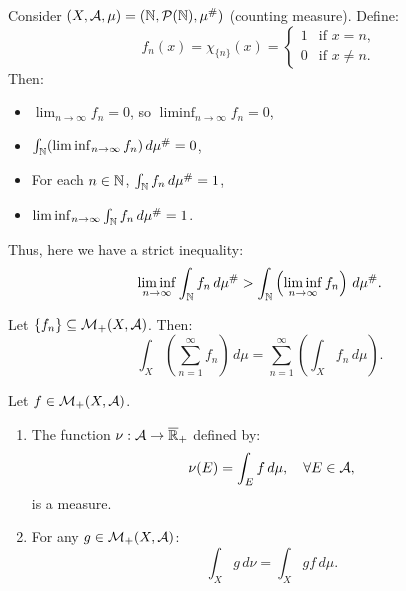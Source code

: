 \begin{remark}
Consider $(X, \mathcal{A}, \mu) = (\mathbb{N}, \mathcal{P}(\mathbb{N}), \mu^{\#})$ (counting measure). Define:
\[
f_n(x) = \chi_{\{n\}}(x) = 
\begin{cases}
1 & \text{if } x = n, \\
0 & \text{if } x \neq n.
\end{cases}
\]
Then:
\begin{itemize}
    \item $\lim_{n \to \infty} f_n = 0$, so $\liminf_{n \to \infty} f_n = 0$,
    \item $\int_{\mathbb{N}} (\liminf_{n \to \infty} f_n) \, d\mu^{\#} = 0$,
    \item For each $n \in \mathbb{N}$, $\int_{\mathbb{N}} f_n \, d\mu^{\#} = 1$,
    \item $\liminf_{n \to \infty} \int_{\mathbb{N}} f_n \, d\mu^{\#} = 1$.
\end{itemize}
Thus, here we have a strict inequality:
\[
\liminf_{n \to \infty} \int_{\mathbb{N}} f_n \, d\mu^{\#} > \int_{\mathbb{N}} \left(\liminf_{n \to \infty} f_n\right) \, d\mu^{\#}.
\]
\end{remark}

\begin{theorem}
Let $\{f_n\} \subseteq \mathcal{M}_+(X, \mathcal{A})$. Then:
\[
\int_X \left(\sum_{n=1}^{\infty} f_n\right) \, d\mu = \sum_{n=1}^{\infty} \left(\int_X f_n \, d\mu\right).
\]
\end{theorem}

\clearpage
\begin{theorem}
Let $f \in \mathcal{M}_+(X, \mathcal{A})$.
\begin{enumerate}
    \item The function $\nu: \mathcal{A} \to \overline{\mathbb{R}}_+$ defined by:
    \[
    \nu(E) = \int_E f \, d\mu, \quad \forall E \in \mathcal{A},
    \]
    is a measure.
    \item For any $g \in \mathcal{M}_+(X, \mathcal{A})$:
    \[
    \int_X g \, d\nu = \int_X gf \, d\mu.
    \]
\end{enumerate}
\end{theorem}

